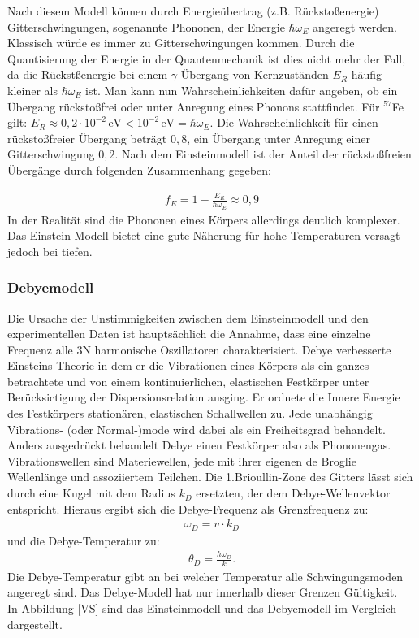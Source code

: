 {Nach diesem Modell können durch Energieübertrag  (z.B. Rückstoßenergie)  Gitterschwingungen, sogenannte Phononen, der Energie $\hbar \omega_E$ angeregt werden. Klassisch würde es immer zu Gitterschwingungen kommen. Durch die Quantisierung der Energie in der Quantenmechanik ist dies nicht mehr der Fall, da die Rückstßenergie bei einem $\gamma$-Übergang von Kernzuständen $E_R$ häufig kleiner als $\hbar \omega_E$ ist. Man kann nun Wahrscheinlichkeiten dafür angeben, ob ein Übergang rückstoßfrei oder unter Anregung eines Phonons stattfindet. Für  $^{57}$Fe gilt:
$E_R\approx0,2\cdot10^{-2}\,\mathrm{eV} < 10^{-2}\,\mathrm{eV}=\hbar\omega_E $. Die Wahrscheinlichkeit für einen rückstoßfreier Übergang beträgt $0,8$, ein Übergang unter Anregung einer Gitterschwingung $0,2$. Nach dem Einsteinmodell ist der Anteil der rückstoßfreien Übergänge durch folgenden Zusammenhang gegeben:

\begin{align}
f_E = 1-\frac{E_R}{\hbar \omega_E}\approx0,9
\end{align}
In der Realität sind die Phononen eines Körpers allerdings deutlich komplexer. Das Einstein-Modell bietet eine gute Näherung für hohe Temperaturen versagt jedoch bei tiefen.

\subsubsection{Debyemodell}

Die Ursache der Unstimmigkeiten zwischen dem Einsteinmodell und den experimentellen Daten ist hauptsächlich die Annahme, dass eine einzelne Frequenz alle 3N harmonische Oszillatoren charakterisiert. Debye verbesserte Einsteins Theorie in dem er die Vibrationen eines Körpers als ein ganzes betrachtete und von einem kontinuierlichen, elastischen Festkörper unter Berücksictigung der Dispersionsrelation ausging. Er ordnete die Innere Energie des Festkörpers stationären, elastischen Schallwellen zu. Jede unabhängig Vibrations- (oder Normal-)mode wird dabei als ein Freiheitsgrad behandelt.
Anders ausgedrückt behandelt Debye einen Festkörper also als Phononengas. Vibrationswellen sind Materiewellen, jede mit ihrer eigenen de Broglie Wellenlänge und assoziiertem Teilchen. 
Die 1.Brioullin-Zone des Gitters lässt sich durch eine Kugel mit dem  Radius  $k_D$ ersetzten, der dem Debye-Wellenvektor entspricht.  Hieraus ergibt sich die Debye-Frequenz als Grenzfrequenz zu:
\begin{align}
\omega_D = v\cdot k_D
\end{align}
und die Debye-Temperatur zu:
\begin{align}
\theta_D = \frac{\hbar\omega_D}{k}.
\end{align}
Die Debye-Temperatur gibt an bei welcher Temperatur alle Schwingungsmoden angeregt sind. Das Debye-Modell hat nur innerhalb dieser Grenzen Gültigkeit.\\
In Abbildung \ref{VS} sind das Einsteinmodell und das Debyemodell im Vergleich dargestellt.

}
